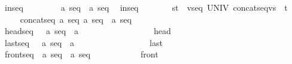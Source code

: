 \begin{isabellebody}
\ \ inseq\ \ \ \ \ \ \ \ {\isacharcolon}{\isacharcolon}\ {\isachardoublequoteopen}{\isacharprime}a\ seq\ {\isacharless}{\isacharequal}{\isachargreater}\ {\isacharprime}a\ seq{\isachardoublequoteclose}\isanewline
\ \ {\isachardoublequoteopen}inseq\ \ \ \ \ \ \ {\isacharequal}{\isacharequal}\ {\isacharbraceleft}{\isacharparenleft}s{\isacharcomma}t{\isacharparenright}{\isachardot}\ {\isacharquery}\ v{\isacharcolon}seq\ UNIV{\isachardot}\ {\isacharparenleft}concatseq{\isacharpercent}{\isacharcircum}{\isacharparenleft}v{\isacharcomma}s{\isacharparenright}{\isacharparenright}\ {\isacharequal}\ t{\isacharbraceright}{\isachardoublequoteclose}\isanewline
\isanewline
\ \isanewline
\ \ \ \isanewline
{}\isamarkupfalse%
\isanewline
\ \ {\isachardoublequoteopen}{\isacharasterisk}concatseq{\isachardoublequoteclose}\ {\isacharcolon}{\isacharcolon}{\isachardoublequoteopen}{\isacharbrackleft}{\isacharprime}a\ seq{\isacharcomma}\ {\isacharprime}a\ seq{\isacharbrackright}\ {\isacharequal}{\isachargreater}\ {\isacharprime}a\ seq{\isachardoublequoteclose}\ \ \ \ \ {\isacharparenleft}{\isachardoublequoteopen}{\isacharparenleft}{}\ {\isacharunderscore}\ {\isacharpercent}{\isacharampersand}{\isacharcircum}{\isacharslash}\ {\isacharunderscore}{\isacharparenright}{\isachardoublequoteclose}\ {\isacharbrackleft}{}{}{\isacharcomma}{}{}{\isacharbrackright}\ {}{}{\isacharparenright}\isanewline
\ \ {\isachardoublequoteopen}{\isacharasterisk}headseq{\isachardoublequoteclose}\ \ \ {\isacharcolon}{\isacharcolon}{\isachardoublequoteopen}{\isacharparenleft}{\isacharprime}a\ seq{\isacharparenright}\ {\isacharequal}{\isachargreater}\ {\isacharprime}a{\isachardoublequoteclose}\ \ \ \ \ \ \ \ \ \ \ \ \ \ \ \ \ {\isacharparenleft}{\isachardoublequoteopen}{\isacharparenleft}{}\ head\ {\isacharunderscore}{\isacharparenright}{\isachardoublequoteclose}\ {}{}{\isacharparenright}\ \isanewline
\ \ {\isachardoublequoteopen}{\isacharasterisk}lastseq{\isachardoublequoteclose}\ \ \ {\isacharcolon}{\isacharcolon}{\isachardoublequoteopen}{\isacharparenleft}{\isacharprime}a\ seq{\isacharparenright}\ {\isacharequal}{\isachargreater}\ {\isacharprime}a{\isachardoublequoteclose}\ \ \ \ \ \ \ \ \ \ \ \ \ \ \ \ \ {\isacharparenleft}{\isachardoublequoteopen}{\isacharparenleft}{}\ last\ {\isacharunderscore}{\isacharparenright}{\isachardoublequoteclose}\ {}{}{\isacharparenright}\ \isanewline
\ \ {\isachardoublequoteopen}{\isacharasterisk}frontseq{\isachardoublequoteclose}\ \ {\isacharcolon}{\isacharcolon}{\isachardoublequoteopen}{\isacharparenleft}{\isacharprime}a\ seq{\isacharparenright}\ {\isacharequal}{\isachargreater}\ {\isacharparenleft}{\isacharprime}a\ seq{\isacharparenright}{\isachardoublequoteclose}\ \ \ \ \ \ \ \ \ \ \ {\isacharparenleft}{\isachardoublequoteopen}{\isacharparenleft}{}\ front\ {\isacharunderscore}{\isacharparenright}{\isachardoublequoteclose}\ {}{}{\isacharparenright}\isanewline

\end{isabellebody}
